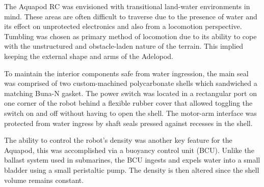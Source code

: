 

		The Aquapod RC \cite{Carlson2011} was envisioned with transitional land-water environments in mind. These areas are often difficult to traverse due to the presence of water and its effect on unprotected electronics and also from a locomotion perspective. Tumbling was chosen as primary method of locomotion due to its ability to cope with the unstructured and obstacle-laden nature of the terrain. This implied keeping the external shape and arms of the Adelopod. 
		
		To maintain the interior components safe from water ingression, the main seal was comprised of two custom-machined polycarbonate shells which sandwiched a matching Buna-N gasket. The power switch was located in a rectangular port on one corner of the robot behind a flexible rubber cover that allowed toggling the switch on and off without having to open the shell. The motor-arm interface was protected from water ingress by shaft seals pressed against recesses in the shell.  


		The ability to control the robot's density was another key feature for the Aquapod, this was accomplished via a buoyancy control unit (BCU). Unlike the ballast system used in submarines, the BCU ingests and expels water into a small bladder using a small peristaltic pump. The density is then altered since the shell volume remains constant. %

